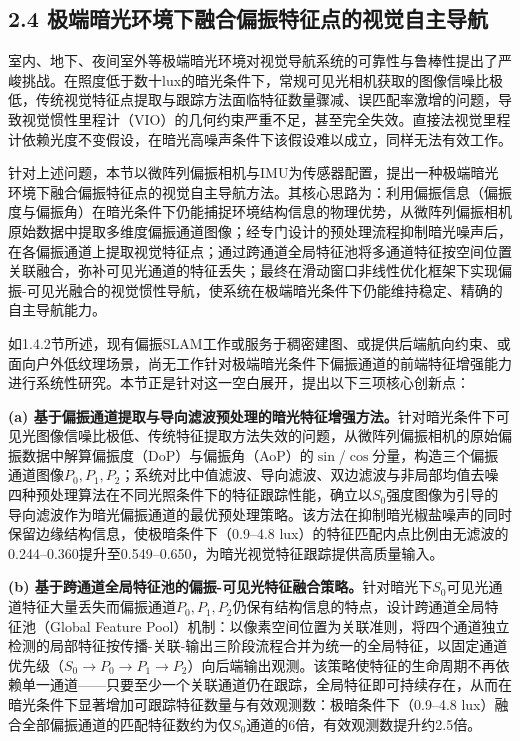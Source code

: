 \subsection*{2.4 极端暗光环境下融合偏振特征点的视觉自主导航}

室内、地下、夜间室外等极端暗光环境对视觉导航系统的可靠性与鲁棒性提出了严峻挑战。在照度低于数十lux的暗光条件下，常规可见光相机获取的图像信噪比极低，传统视觉特征点提取与跟踪方法面临特征数量骤减、误匹配率激增的问题，导致视觉惯性里程计（VIO）的几何约束严重不足，甚至完全失效。直接法视觉里程计依赖光度不变假设，在暗光高噪声条件下该假设难以成立，同样无法有效工作。

针对上述问题，本节以微阵列偏振相机与IMU为传感器配置，提出一种极端暗光环境下融合偏振特征点的视觉自主导航方法。其核心思路为：利用偏振信息（偏振度与偏振角）在暗光条件下仍能捕捉环境结构信息的物理优势，从微阵列偏振相机原始数据中提取多维度偏振通道图像；经专门设计的预处理流程抑制暗光噪声后，在各偏振通道上提取视觉特征点；通过跨通道全局特征池将多通道特征按空间位置关联融合，弥补可见光通道的特征丢失；最终在滑动窗口非线性优化框架下实现偏振-可见光融合的视觉惯性导航，使系统在极端暗光条件下仍能维持稳定、精确的自主导航能力。

如1.4.2节所述，现有偏振SLAM工作或服务于稠密建图、或提供后端航向约束、或面向户外低纹理场景，尚无工作针对极端暗光条件下偏振通道的前端特征增强能力进行系统性研究。本节正是针对这一空白展开，提出以下三项核心创新点：

\textbf{(a) 基于偏振通道提取与导向滤波预处理的暗光特征增强方法。}针对暗光条件下可见光图像信噪比极低、传统特征提取方法失效的问题，从微阵列偏振相机的原始偏振数据中解算偏振度（DoP）与偏振角（AoP）的$\sin$/$\cos$分量，构造三个偏振通道图像$P_0, P_1, P_2$；系统对比中值滤波、导向滤波、双边滤波与非局部均值去噪四种预处理算法在不同光照条件下的特征跟踪性能，确立以$S_0$强度图像为引导的导向滤波作为暗光偏振通道的最优预处理策略。该方法在抑制暗光椒盐噪声的同时保留边缘结构信息，使极暗条件下（0.9--4.8 lux）的特征匹配内点比例由无滤波的0.244--0.360提升至0.549--0.650，为暗光视觉特征跟踪提供高质量输入。

\textbf{(b) 基于跨通道全局特征池的偏振-可见光特征融合策略。}针对暗光下$S_0$可见光通道特征大量丢失而偏振通道$P_0, P_1, P_2$仍保有结构信息的特点，设计跨通道全局特征池（Global Feature Pool）机制：以像素空间位置为关联准则，将四个通道独立检测的局部特征按传播-关联-输出三阶段流程合并为统一的全局特征，以固定通道优先级（$S_0 \rightarrow P_0 \rightarrow P_1 \rightarrow P_2$）向后端输出观测。该策略使特征的生命周期不再依赖单一通道——只要至少一个关联通道仍在跟踪，全局特征即可持续存在，从而在暗光条件下显著增加可跟踪特征数量与有效观测数：极暗条件下（0.9--4.8 lux）融合全部偏振通道的匹配特征数约为仅$S_0$通道的6倍，有效观测数提升约2.5倍。

